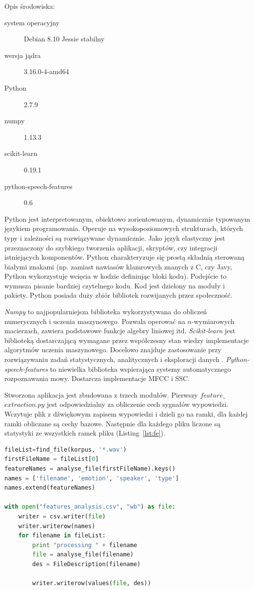 \documentclass[a4paper,12pt,twoside,openany]{report}
\newcommand{\Lst}[1]{(Listing~\ref{#1})}
\begin{document}
Opis środowiska:
\begin{description}
	\item [system operacyjny] Debian 8.10 Jessie stabilny 
	\item [wersja jądra] 3.16.0-4-amd64
	\item [Python] 2.7.9
	\item [numpy] 1.13.3
	\item [scikit-learn] 0.19.1
	\item [python-speech-features] 0.6
\end{description}
Python jest interpretowanym, obiektowo zorientowanym, dynamicznie typowanym językiem programowania.
Operuje na wysokopoziomowych strukturach, których typy i zależności są rozwiązywane dynamicznie.
Jako język elastyczny jest przeznaczony do szybkiego tworzenia aplikacji, skryptów, czy integracji istniejących komponentów.
Python charakteryzuje się prostą składnią sterowaną białymi znakami 
(np. zamiast nawiasów klamrowych znanych z C, czy Javy, Python wykorzystuje wcięcia w kodzie definiując bloki kodu).
Podejście to wymusza pisanie bardziej czytelnego kodu.
Kod jest dzielony na moduły i pakiety.
Python posiada duży zbiór bibliotek rozwijanych przez społeczność.

\textit{Numpy} to najpopularniejsza biblioteka wykorzystywana do obliczeń numerycznych i uczenia maszynowego.
Pozwala operować na $n$-wymiarowych macierzach, zawiera podstawowe funkcje algebry liniowej itd.
\textit{Scikit-learn} jest biblioteką dostarczającą wymagane przez współczesny stan wiedzy implementacje algorytmów uczenia maszynowego.
Docelowo znajduje zastosowanie przy rozwiązywaniu zadań statystycznych, analitycznych i eksploracji danych \cite{OShaughnessy2008}.  
\textit{Python-speech-features} to niewielka biblioteka wspierająca systemy automatycznego rozpoznawania mowy. 
Dostarcza implementacje MFCC i SSC.

Stworzona aplikacja jest zbudowana z trzech modułów.
Pierwszy $feature\_$ $extraction.py$ jest odpowiedzialny za obliczenie cech sygnałów wypowiedzi. %
Wczytuje plik z dźwiękowym zapisem wypowiedzi i dzieli go na ramki, 
dla każdej ramki obliczane są cechy bazowe.
Następnie dla każdego pliku liczone są statystyki ze wszystkich ramek pliku \Lst{lst:fe}.

\begin{lstlisting}[language=python,caption={Program obliczający cechy wypowiedzi},label={lst:fe}]
fileList=find_file(korpus, '*.wav')
firstFileName = fileList[0]
featureNames = analyse_file(firstFileName).keys()
names = ['filename', 'emotion', 'speaker', 'type']
names.extend(featureNames)

with open("features_analysis.csv", "wb") as file:
    writer = csv.writer(file)
    writer.writerow(names)
    for filename in fileList:
        print "processing " + filename
        file = analyse_file(filename)
        des = FileDescription(filename)

        writer.writerow(values(file, des))	
\end{lstlisting}
\end{document}
